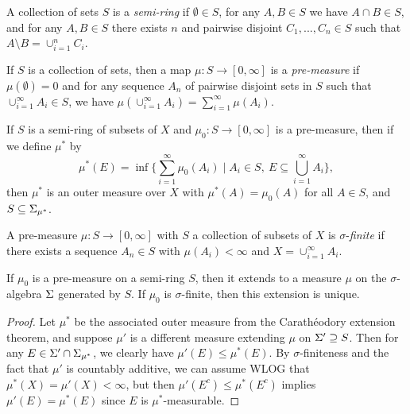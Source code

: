 \begin{defn} A collection of sets $S$ is a \emph{semi-ring} if $\emptyset \in S$, for any $A,B \in S$ we have $A \cap B \in S$, and for any $A, B \in S$ there exists $n$ and pairwise disjoint $C_1, ..., C_n \in S$ such that $A \setminus B = \cup_{i=1}^n C_i$.
\end{defn}

\begin{defn} If $S$ is a collection of sets, then a map $\mu : S \rightarrow [0,\infty]$ is a \emph{pre-measure} if $\mu(\emptyset) = 0$ and for any sequence $A_n$ of pairwise disjoint sets in $S$ such that $\cup_{i=1}^\infty A_i \in S$, we have $\mu(\cup_{i=1}^\infty A_i) = \sum_{i=1}^\infty \mu(A_i)$.
\end{defn}

\begin{thm}\label{caratheodory-extension} If $S$ is a semi-ring of subsets of $X$ and $\mu_0 : S \rightarrow [0,\infty]$ is a pre-measure, then if we define $\mu^*$ by
\[
\mu^*(E) = \inf \Big\{\sum_{i=1}^\infty \mu_0(A_i) \mid A_i \in S,\ E \subseteq \bigcup_{i=1}^\infty A_i\Big\},
\]
then $\mu^*$ is an outer measure over $X$ with $\mu^*(A) = \mu_0(A)$ for all $A\in S$, and $S \subseteq \Sigma_{\mu^*}$.
\end{thm}

\begin{defn} A pre-measure $\mu : S \rightarrow [0,\infty]$ with $S$ a collection of subsets of $X$ is $\sigma$-\emph{finite} if there exists a sequence $A_n \in S$ with $\mu(A_i) < \infty$ and $X = \cup_{i=1}^\infty A_i$.
\end{defn}

\begin{thm} If $\mu_0$ is a pre-measure on a semi-ring $S$, then it extends to a measure $\mu$ on the $\sigma$-algebra $\Sigma$ generated by $S$. If $\mu_0$ is $\sigma$-finite, then this extension is unique.
\end{thm}
\begin{proof} Let $\mu^*$ be the associated outer measure from the Carath\'eodory extension theorem, and suppose $\mu'$ is a different measure extending $\mu$ on $\Sigma' \supseteq S$. Then for any $E \in \Sigma' \cap \Sigma_{\mu^*}$, we clearly have $\mu'(E) \le \mu^*(E)$. By $\sigma$-finiteness and the fact that $\mu'$ is countably additive, we can assume WLOG that $\mu^*(X) = \mu'(X) < \infty$, but then $\mu'(E^c) \le \mu^*(E^c)$ implies $\mu'(E) = \mu^*(E)$ since $E$ is $\mu^*$-measurable.
\end{proof}

